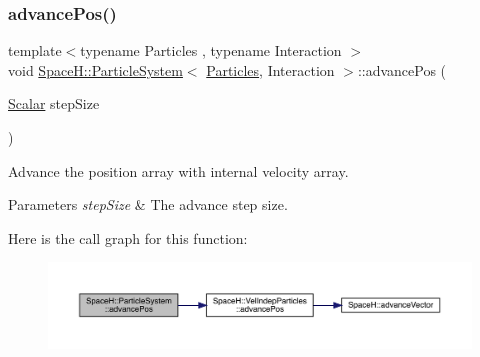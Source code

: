 \subsubsection{\texorpdfstring{advance\+Pos()}{advancePos()}\hspace{0.1cm}{\footnotesize\ttfamily [1/2]}}
{\footnotesize\ttfamily template$<$typename Particles , typename Interaction $>$ \\
void \mbox{\hyperlink{class_space_h_1_1_particle_system}{Space\+H\+::\+Particle\+System}}$<$ \mbox{\hyperlink{struct_space_h_1_1_particles}{Particles}}, Interaction $>$\+::advance\+Pos (\begin{DoxyParamCaption}\item[{\mbox{\hyperlink{class_space_h_1_1_particle_system_a522770dcfaf8b29aed35ea9348185a34}{Scalar}}}]{step\+Size }\end{DoxyParamCaption})\hspace{0.3cm}{\ttfamily [inline]}}



Advance the position array with internal velocity array. 


\begin{DoxyParams}{Parameters}
{\em step\+Size} & The advance step size. \\
\hline
\end{DoxyParams}
Here is the call graph for this function\+:
\nopagebreak
\begin{figure}[H]
\begin{center}
\leavevmode
\includegraphics[width=350pt]{class_space_h_1_1_particle_system_acdd6ab19e8a43161d4e508efd4f01d5c_cgraph}
\end{center}
\end{figure}
\mbox{\label{class_space_h_1_1_particle_system_a9d29a47e00ceed6b77b5e0fec5b967f2}} 
